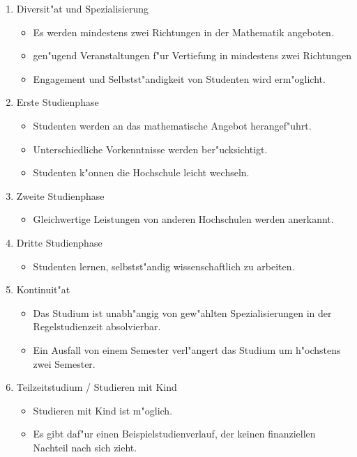 \documentclass[a4paper,11pt]{article}
\begin{document}
\begin{enumerate}
\item Diversit"at und Spezialisierung
 \begin{itemize}
 \item Es werden mindestens zwei Richtungen in der Mathematik angeboten.
 \item gen"ugend Veranstaltungen f"ur Vertiefung in mindestens zwei Richtungen
 \item Engagement und Selbstst"andigkeit von Studenten wird erm"oglicht.
 \end{itemize}

\item Erste Studienphase
 \begin{itemize}
 \item Studenten werden an das mathematische Angebot herangef"uhrt.
 \item Unterschiedliche Vorkenntnisse werden ber"ucksichtigt.
 \item Studenten k"onnen die Hochschule leicht wechseln.
 \end{itemize}

\item Zweite Studienphase
 \begin{itemize}
 \item Gleichwertige Leistungen von anderen Hochschulen werden anerkannt.
 \end{itemize}

\item Dritte Studienphase
 \begin{itemize}
 \item Studenten lernen, selbstst"andig wissenschaftlich zu arbeiten.
 \end{itemize}

\item Kontinuit"at
 \begin{itemize}
 \item Das Studium ist unabh"angig von gew"ahlten Spezialisierungen in der Regelstudienzeit absolvierbar.
 \item Ein Ausfall von einem Semester verl"angert das Studium um h"ochstens zwei Semester.
 \end{itemize}

\item Teilzeitstudium / Studieren mit Kind
 \begin{itemize}
 \item Studieren mit Kind ist m"oglich.
 \item Es gibt daf"ur einen Beispielstudienverlauf, der keinen finanziellen Nachteil nach sich zieht.
 \end{itemize}


\end{enumerate}
\end{document}
